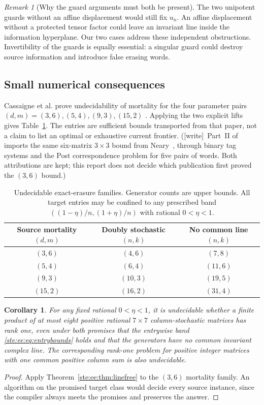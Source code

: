 \documentclass[11pt,letterpaper]{article}
\newtheorem{corollary}[theorem]{Corollary}
\theoremstyle{definition}
\theoremstyle{remark}
\newtheorem{remark}[theorem]{Remark}
\newcommand{\wtag}{\textup{[write]}}
\begin{document}
\begin{remark}[Why the guard arguments must both be present]
The two unipotent guards without an affine displacement would still fix $u_n$.
An affine displacement without a protected tensor factor could leave an
invariant line inside the information hyperplane. Our two cases address these
independent obstructions. Invertibility of the guards is equally essential:
a singular guard could destroy source information and introduce false erasing
words.
\end{remark}

\subsection{Small numerical consequences}

Cassaigne et al. prove undecidability of mortality for the four parameter pairs
$(d,m)=(3,6),(5,4),(9,3),(15,2)$ \cite{cassaigne}. Applying the two explicit lifts
gives Table~\ref{ste:ee:tab:bounds}. The entries are sufficient bounds transported from
that paper, not a claim to list an optimal or exhaustive current frontier.
(\wtag\ Part~II of~\cite{pqc} imports the same six-matrix $3\times3$ bound from Neary~\cite[Corollary~12]{neary}, through binary tag systems and the Post correspondence problem for five pairs of words. Both attributions are kept; this report does not decide which publication first proved the $(3,6)$ bound.)

\begin{table}[ht]
\centering
\begin{tabular}{@{}ccc@{}}
\toprule
Source mortality $(d,m)$ & Doubly stochastic $(n,k)$ & No common line $(n,k)$\\
\midrule
$(3,6)$ & $(4,6)$ & $(7,8)$\\
$(5,4)$ & $(6,4)$ & $(11,6)$\\
$(9,3)$ & $(10,3)$ & $(19,5)$\\
$(15,2)$ & $(16,2)$ & $(31,4)$\\
\bottomrule
\end{tabular}
\caption{Undecidable exact-erasure families. Generator counts are upper bounds.
All target entries may be confined to any prescribed band
$((1-\eta)/n,(1+\eta)/n)$ with rational $0<\eta<1$.}
\label{ste:ee:tab:bounds}
\end{table}

\begin{corollary}\label{ste:ee:cor:seven}
For any fixed rational $0<\eta<1$, it is undecidable whether a finite product of
at most eight positive rational $7\times7$ column-stochastic matrices has rank
one, even under both promises that the entrywise band
\eqref{ste:ee:eq:entrybounds} holds and that the generators have no common invariant
complex line. The corresponding rank-one problem for positive integer matrices
with one common positive column sum is also undecidable.
\end{corollary}
\begin{proof}
Apply Theorem~\ref{ste:ee:thm:linefree} to the $(3,6)$ mortality family. An algorithm on
the promised target class would decide every source instance, since the compiler
always meets the promises and preserves the answer.
\end{proof}
\end{document}
